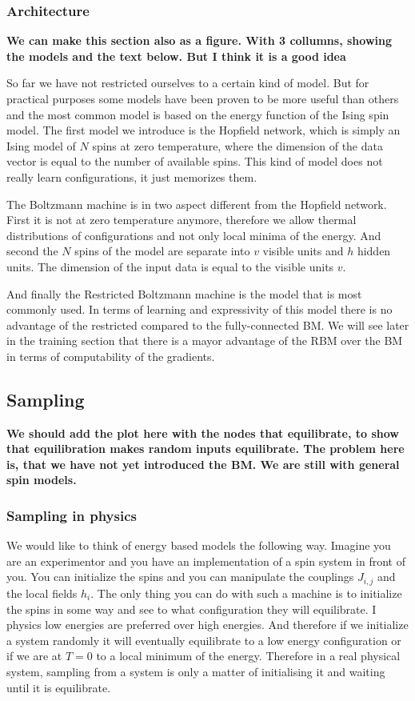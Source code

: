 \documentclass[nofootinbib, superscriptaddress, prl]{revtex4}
\begin{document}
\subsubsection{Architecture}

\textbf{We can make this section also as a figure. With 3 collumns, showing the models and the text below. But I think it is a good idea }

So far we have not restricted ourselves to a certain kind of model. But for practical purposes some models have been proven to be more useful than others and the most common model is based on the energy function of the Ising spin model. The first model we introduce is the Hopfield network, which is simply an Ising model of $N$ spins at zero temperature, where the dimension of the data vector is equal to the number of available spins. This kind of model does not really learn configurations, it just memorizes them. 

The Boltzmann machine is in two aspect different from the Hopfield network. First it is not at zero temperature anymore, therefore we allow thermal distributions of configurations and not only local minima of the energy. And second the $N$ spins of the model are separate into $v$ visible units and $h$ hidden units. The dimension of the input data is equal to the visible units $v$.

And finally the Restricted Boltzmann machine is the model that is most commonly used. In terms of learning and expressivity of this model there is no advantage of the restricted compared to the fully-connected BM. We will see later in the training section that there is a mayor advantage of the RBM over the BM in terms of computability of the gradients.

\subsection{Sampling}

\textbf{We should add the plot here with the nodes that equilibrate, to show that equilibration makes random inputs equilibrate. The problem here is, that we have not yet introduced the BM. We are still with general spin models.}

\subsubsection{Sampling in physics}
We would like to think of energy based models the following way. Imagine you are an experimentor and you have an implementation of a spin system in front of you. You can initialize the spins and you can manipulate the couplings $J_{i,j}$ and the local fields $h_i$. The only thing you can do with such a machine is to initialize the spins in some way and see to what configuration they will equilibrate.
I physics low energies are preferred over high energies. 
And therefore if we initialize a system randomly it will eventually equilibrate to a low energy configuration or if we are at $T=0$ to a local minimum of the energy.
Therefore in a real physical system, sampling from a system is only a matter of initialising it and waiting until it is equilibrate.
\end{document}
